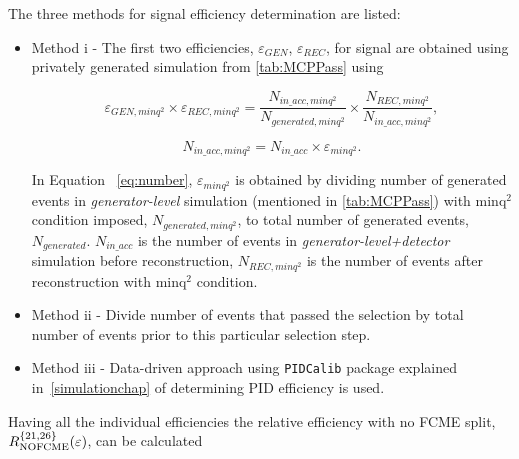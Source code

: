 The three methods for signal efficiency determination are listed:

\begin{itemize}
	\item Method \Rn{1} - The first two efficiencies, $\varepsilon_{GEN}$, $\varepsilon_{REC}$, for signal are obtained using privately generated simulation from \autoref{tab:MCPPass} using

\begin{equation}
{\varepsilon_{GEN,minq^{2}}}\times {\varepsilon_{REC,minq^{2}}}= \frac{N_{in\_acc,minq^{2}}}{N_{generated,minq^{2}}}\times \frac{N_{REC,minq^{2}}}{N_{in\_acc,minq^{2}}},
\end{equation}

\begin{equation}
N_{in\_acc,minq^{2}} = N_{in\_acc} \times \varepsilon_{minq^{2}}.
\label{eq:number}
\end{equation}

In Equation ~\autoref{eq:number}, $\varepsilon_{minq^{2}}$ is obtained by dividing number of generated events in \textit{generator-level} simulation (mentioned in \autoref{tab:MCPPass}) with minq$^2$ condition imposed, $N_{generated,minq^{2}}$, to total number of generated events, $N_{generated}$. $N_{in\_acc}$ is the number of events in \textit{generator-level+detector} simulation before reconstruction, $N_{REC,minq^{2}}$ is the number of events after reconstruction with minq$^2$ condition.
\item Method \Rn{2} - Divide number of events that passed the selection by total number of events prior to this particular selection step.
\item Method \Rn{3} - Data-driven approach using \texttt{PIDCalib} package explained in~\autoref{simulationchap} of determining PID efficiency is used.
\end{itemize}

Having all the individual efficiencies the relative efficiency with no FCME split, $R_{\rm{NOFCME}}^{\{21,26\}}(\varepsilon)$, can be calculated 


